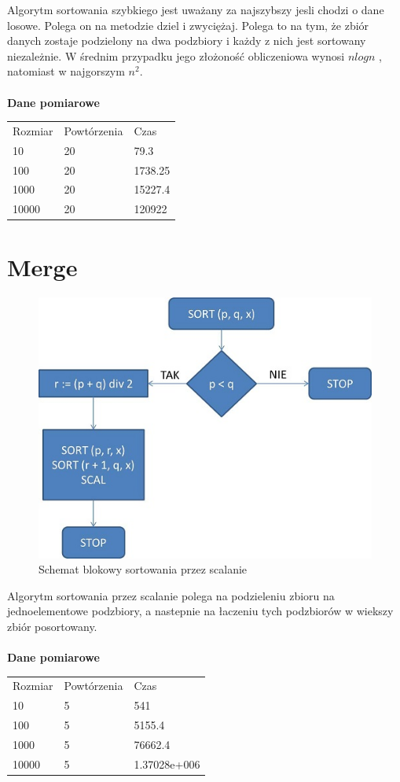 \documentclass[12pt,oneside]{mwbk}
\begin{document}
	\indent Algorytm sortowania szybkiego jest uważany za najszybszy jesli chodzi o dane losowe. Polega on na metodzie dziel i 			zwyciężaj. Polega to na tym, że zbiór danych zostaje podzielony na dwa podzbiory i każdy z nich jest sortowany niezależnie.
	W średnim przypadku jego złożoność obliczeniowa wynosi $nlogn$ , natomiast w najgorszym $n^{2}$.\\
	\\
	\textbf{Dane pomiarowe}
	\begin{table}[!h]
	\begin{tabular}{lll}
	Rozmiar & Powtórzenia & Czas         \\
	10      & 20          & 79.3         \\
	100     & 20          & 1738.25      \\
	1000    & 20          & 15227.4      \\
	10000   & 20          & 120922       \\
	\end{tabular}
	\end{table}


\section {Merge}
	\begin{figure}[!h]
	\centering
	\includegraphics[scale=0.5]{rys/merge.jpg}
	\caption{Schemat blokowy sortowania przez scalanie}
	\end{figure}

	\indent Algorytm sortowania przez scalanie polega na podzieleniu zbioru na jednoelementowe podzbiory, a nastepnie na łaczeniu tych podzbiorów w wiekszy zbiór posortowany. \\
	\\
	\textbf{Dane pomiarowe}
	\begin{table}[!h]
	\begin{tabular}{lll}
	Rozmiar & Powtórzenia & Czas         \\
	10&5&541\\
	100&5&5155.4\\
	1000&5&76662.4\\
	10000&5&1.37028e+006
	\end{tabular}
	\end{table}
\end{document}
